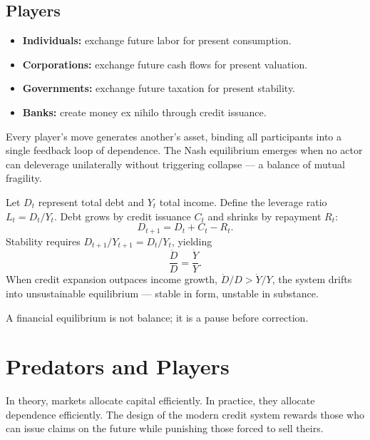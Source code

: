 \documentclass[12pt,twoside]{book}
\begin{document}
\subsection*{Players}
\begin{itemize}
  \item \textbf{Individuals:} exchange future labor for present consumption.  
  \item \textbf{Corporations:} exchange future cash flows for present valuation.  
  \item \textbf{Governments:} exchange future taxation for present stability.  
  \item \textbf{Banks:} create money ex nihilo through credit issuance.  
\end{itemize}

Every player’s move generates another’s asset, binding all participants into a single feedback loop of dependence.  
The Nash equilibrium emerges when no actor can deleverage unilaterally without triggering collapse --- a balance of mutual fragility.

\begin{tcolorbox}[colback=gray!5,colframe=gray!60,boxrule=0.4pt,arc=1mm,
title={Mathematical Interlude: Debt as Dynamic Equilibrium}]
Let $D_t$ represent total debt and $Y_t$ total income.  
Define the leverage ratio $L_t = D_t / Y_t$.  
Debt grows by credit issuance $C_t$ and shrinks by repayment $R_t$:
\[
D_{t+1} = D_t + C_t - R_t.
\]
Stability requires $D_{t+1}/Y_{t+1} = D_t/Y_t$, yielding
\[
\frac{\dot{D}}{D} = \frac{\dot{Y}}{Y}.
\]
When credit expansion outpaces income growth, $\dot{D}/D > \dot{Y}/Y$, the system drifts into unsustainable equilibrium --- stable in form, unstable in substance.
\end{tcolorbox}

\begin{keyidea}
A financial equilibrium is not balance; it is a pause before correction.
\end{keyidea}

\section{Predators and Players}

In theory, markets allocate capital efficiently.  
In practice, they allocate dependence efficiently.  
The design of the modern credit system rewards those who can issue claims on the future while punishing those forced to sell theirs.
\end{document}

